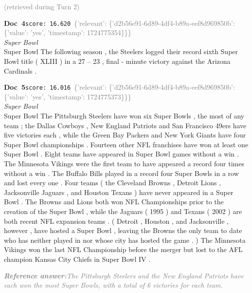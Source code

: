 \documentclass[a4paper,11pt]{article}
\begin{document}
\hfill{\tiny\textcolor{gray}{(retrieved during Turn 2)}}
\begin{docenv}
{\footnotesize\textcolor{doccolor}{\textbf{Doc~4}}}\hfill{\tiny\texttt{score:~16.620}}\ {\tiny\textcolor{gray}{\{'relevant': \{'d2b56e91-6d89-4df4-b89a-eef8d969850b': \{'value': 'yes', 'timestamp': 1724775354\}\}\}}}\\[3pt]
{\small\textit{Super Bowl}}\\[2pt]
\vspace{2pt}
{\footnotesize Super Bowl
The following season , the Steelers logged their record sixth Super Bowl title ( XLIII ) in a 27 -- 23 , final - minute victory against the Arizona Cardinals .}
\end{docenv}
\begin{docenv}
{\footnotesize\textcolor{doccolor}{\textbf{Doc~5}}}\hfill{\tiny\texttt{score:~16.016}}\ {\tiny\textcolor{gray}{\{'relevant': \{'d2b56e91-6d89-4df4-b89a-eef8d969850b': \{'value': 'yes', 'timestamp': 1724775373\}\}\}}}\\[3pt]
{\small\textit{Super Bowl}}\\[2pt]
\vspace{2pt}
{\footnotesize Super Bowl
The Pittsburgh Steelers have won six Super Bowls , the most of any team ; the Dallas Cowboys , New England Patriots and San Francisco 49ers have five victories each , while the Green Bay Packers and New York Giants have four Super Bowl championships . Fourteen other NFL franchises have won at least one Super Bowl . Eight teams have appeared in Super Bowl games without a win . The Minnesota Vikings were the first team to have appeared a record four times without a win . The Buffalo Bills played in a record four Super Bowls in a row and lost every one . Four teams ( the Cleveland Browns , Detroit Lions , Jacksonville Jaguars , and Houston Texans ) have never appeared in a Super Bowl . The Browns and Lions both won NFL Championships prior to the creation of the Super Bowl , while the Jaguars ( 1995 ) and Texans ( 2002 ) are both recent NFL expansion teams . ( Detroit , Houston , and Jacksonville , however , have hosted a Super Bowl , leaving the Browns the only team to date who has neither played in nor whose city has hosted the game . ) The Minnesota Vikings won the last NFL Championship before the merger but lost to the AFL champion Kansas City Chiefs in Super Bowl IV .}
\end{docenv}
\begin{refanswerenv}
{\footnotesize\textit{\textcolor{gray}{\textbf{Reference answer:}\enspace The Pittsburgh Steelers and the New England Patriots have each won the most Super Bowls, with a total of 6 victories for each team.}}}
\end{refanswerenv}
\end{document}
